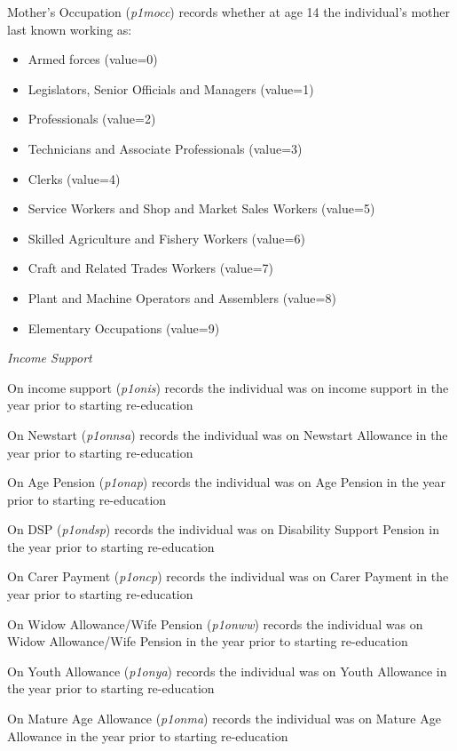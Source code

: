 \documentclass[12pt, a4paper]{article}
\begin{document}
Mother’s Occupation (\textit{p1\textunderscore{}mocc}) records whether at age 14 the individual’s mother last known working as:
\begin{itemize}
  \item Armed forces (value=0)
  \item Legislators, Senior Officials and Managers (value=1)
  \item Professionals (value=2)
  \item Technicians and Associate Professionals (value=3)
  \item Clerks (value=4)
  \item Service Workers and Shop and Market Sales Workers (value=5)
  \item Skilled Agriculture and Fishery Workers (value=6)
  \item Craft and Related Trades Workers (value=7)
  \item Plant and Machine Operators and Assemblers (value=8)
  \item Elementary Occupations (value=9)
\end{itemize}  

\emph{Income Support}

On income support (\textit{p1\textunderscore{}onis}) records the individual was on income support in the year prior to starting re-education

On Newstart (\textit{p1\textunderscore{}onnsa}) records the individual was on Newstart Allowance in the year prior to starting re-education

On Age Pension (\textit{p1\textunderscore{}onap}) records the individual was on Age Pension in the year prior to starting re-education

On DSP (\textit{p1\textunderscore{}ondsp}) records the individual was on Disability Support Pension in the year prior to starting re-education

On Carer Payment (\textit{p1\textunderscore{}oncp}) records the individual was on Carer Payment in the year prior to starting re-education

On Widow Allowance/Wife Pension (\textit{p1\textunderscore{}onww}) records the individual was on Widow Allowance/Wife Pension in the year prior to starting re-education

On Youth Allowance (\textit{p1\textunderscore{}onya}) records the individual was on Youth Allowance in the year prior to starting re-education

On Mature Age Allowance (\textit{p1\textunderscore{}onma}) records the individual was on Mature Age Allowance in the year prior to starting re-education
\end{document}

